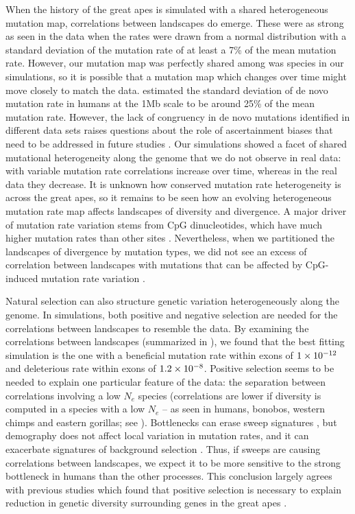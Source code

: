 When the history of the great apes is simulated with a shared heterogeneous mutation map,
correlations between landscapes do emerge.
These were as strong as seen in the data when the rates were drawn from a normal distribution
with a standard deviation of the mutation rate of at least a 7\% of the mean mutation rate.
However, our mutation map was perfectly shared among was species in our simulations,
so it is possible that a mutation map which changes over time might move closely to match the data.
\citet{smith_large_2018} estimated the standard deviation of de novo mutation rate in humans at the 1Mb scale to be around 25\% of the mean mutation rate.
However, the lack of congruency in de novo mutations identified in different data sets raises questions about the role of ascertainment biases that need to be addressed in future studies \citep{castellano_impact_2020}.
Our simulations showed a facet of shared mutational heterogeneity along the genome
that we do not observe in real data: with variable mutation rate correlations increase over time,
whereas in the real data they decrease.
It is unknown how conserved mutation rate heterogeneity is across the great apes,
so it remains to be seen how an evolving heterogeneous mutation rate map affects landscapes of diversity and divergence.
A major driver of mutation rate variation stems from CpG dinucleotides,
which have much higher mutation rates than other sites \citep{agarwal_mutation_2021, nachman_estimate_2000, hodgkinson_variation_2011}.
Nevertheless, when we partitioned the landscapes of divergence by mutation types,
we did not see an excess of correlation between landscapes with mutations
that can be affected by CpG-induced mutation rate variation .

Natural selection can also structure genetic variation heterogeneously along the genome.
In simulations,
both positive and negative selection are needed for the correlations between landscapes to resemble the data.
By examining the correlations between landscapes (summarized in ),
we found that the best fitting simulation is the one with a beneficial mutation rate within exons of ${1}\times10^{-12}$ and deleterious rate within exons of ${1.2}\times10^{-8}$.
Positive selection seems to be needed to explain one particular feature of the data:
the separation between correlations involving a low $N_e$ species (\ie correlations are lower if diversity is computed in a species with a low $N_e$ -- as seen in humans, bonobos, western chimps and eastern gorillas; see ).
Bottlenecks can erase sweep signatures \citep{przeworski_signature_2002, jensen_distinguishing_2005, nielsen_genomic_2005},
but demography does not affect local variation in mutation rates,
and it can exacerbate signatures of background selection \citep{torres_human_2018}.
Thus, if sweeps are causing correlations between landscapes,
we expect it to be more sensitive to the strong bottleneck in humans than the other processes.
This conclusion largely agrees with previous studies which found that positive selection is necessary to explain reduction in genetic diversity surrounding genes in the great apes \citep{nam_evidence_2017}.

